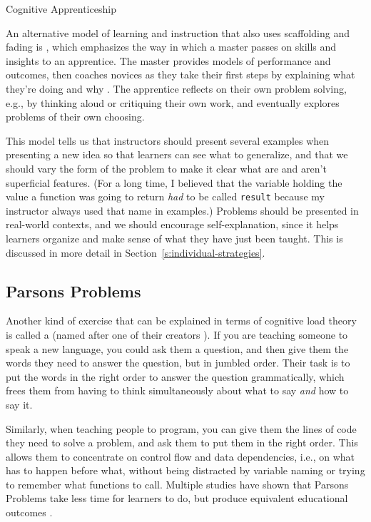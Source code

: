 \begin{aside}{Cognitive Apprenticeship}

An alternative model of learning and instruction that also uses
scaffolding and fading is
,
which emphasizes the way in which a master passes on skills and
insights to an apprentice. The master provides models of performance
and outcomes, then coaches novices as they take their first steps by
explaining what they're doing and why \cite{Coll1991,Casp2007}. The
apprentice reflects on their own problem solving, e.g., by thinking
aloud or critiquing their own work, and eventually explores problems
of their own choosing.

This model tells us that instructors should present several examples
when presenting a new idea so that learners can see what to
generalize, and that we should vary the form of the problem to make it
clear what are and aren't superficial features. (For a long time, I
believed that the variable holding the value a function was going to
return \emph{had} to be called \texttt{result} because my instructor always used
that name in examples.) Problems should be presented in real-world
contexts, and we should encourage self-explanation, since it helps
learners organize and make sense of what they have just been taught.
This is discussed in more detail in
Section~\ref{s:individual-strategies}.

\end{aside}

\subsection*{Parsons Problems}

Another kind of exercise that can be explained in terms of cognitive
load theory is called a 
(named after one of their creators \cite{Pars2006}). If you are
teaching someone to speak a new language, you could ask them a question,
and then give them the words they need to answer the question, but in
jumbled order. Their task is to put the words in the right order to
answer the question grammatically, which frees them from having to think
simultaneously about what to say \emph{and} how to say it.

Similarly, when teaching people to program, you can give them the lines
of code they need to solve a problem, and ask them to put them in the
right order. This allows them to concentrate on control flow and data
dependencies, i.e., on what has to happen before what, without being
distracted by variable naming or trying to remember what functions to
call. Multiple studies have shown that Parsons Problems take less time
for learners to do, but produce equivalent educational outcomes
\cite{Eric2017}.

